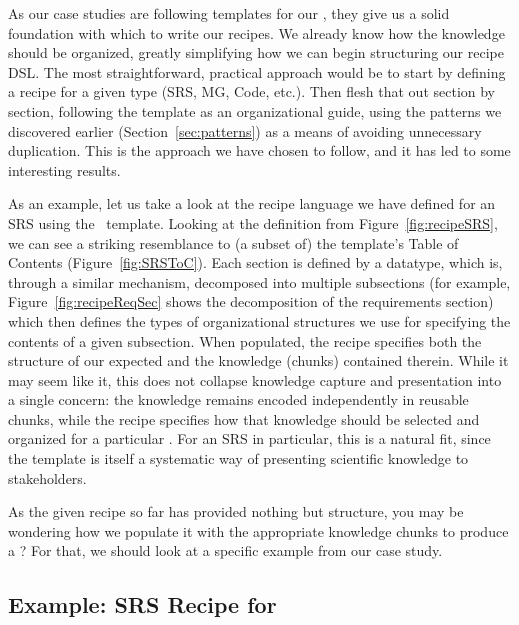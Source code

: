 As our case studies are following templates for our \sfs{}, they give us a 
solid foundation with which to write our recipes. We already know how the 
knowledge should be organized, greatly simplifying how we can begin structuring 
our recipe DSL. The most straightforward, practical approach would be to start 
by defining a recipe for a given \sf{} type (SRS, MG, Code, etc.). Then flesh 
that out section by section, following the template as an organizational guide, 
using the patterns we discovered earlier (Section~\ref{sec:patterns}) as a 
means of avoiding unnecessary duplication. This is the approach we have chosen 
to follow, and it has led to some interesting results.


As an example, let us take a look at the recipe language we have defined for an 
SRS using the \smithea{}\ template. Looking at the  
definition from Figure~\ref{fig:recipeSRS}, we can see a striking resemblance 
to (a subset of) the template's Table of Contents (Figure~\ref{fig:SRSToC}). 
Each section is defined by a datatype, which is, through a similar mechanism, 
decomposed into multiple subsections (for example, 
Figure~\ref{fig:recipeReqSec} shows the decomposition of the requirements 
section) which then defines the types of organizational structures we use for 
specifying the contents of a given subsection. When populated, the recipe 
specifies both the structure of our expected \sf{} and the knowledge (chunks) 
contained therein. While it may seem like it, this does not collapse knowledge 
capture and presentation into a single concern: the knowledge remains encoded 
independently in reusable chunks, while the recipe specifies how that knowledge 
should be selected and organized for a particular \sf{}. For an SRS in 
particular, this is a natural fit, since the template is itself a systematic 
way of presenting scientific knowledge to stakeholders.


As the given recipe so far has provided nothing but structure, you may be 
wondering how we populate it with the appropriate knowledge chunks to produce a 
\sf{}? For that, we should look at a specific example from our \gb{} case study.

\subsection{Example: SRS Recipe for \gb{}}
\label{sec:glassBRSRSRecipe}

